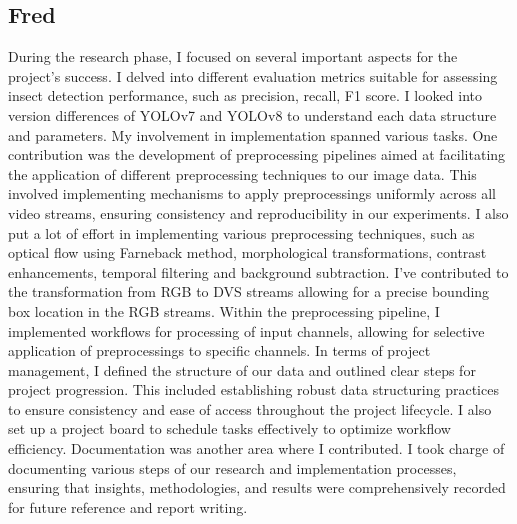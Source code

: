 \documentclass[sigchi,screen]{acmart}
\begin{document}
\subsection{Fred}

During the research phase, I focused on several important aspects for the project's success. I delved into different evaluation metrics suitable for assessing insect detection performance, such as precision, recall, F1 score. I looked into version differences of YOLOv7 and YOLOv8 to understand each data structure and parameters.
My involvement in implementation spanned various tasks. One contribution was the development of preprocessing pipelines aimed at facilitating the application of different preprocessing techniques to our image data. This involved implementing mechanisms to apply preprocessings uniformly across all video streams, ensuring consistency and reproducibility in our experiments. I also put a lot of effort in implementing various preprocessing techniques, such as optical flow using Farneback method, morphological transformations, contrast enhancements, temporal filtering and background subtraction.
I've contributed to the transformation from RGB to DVS streams allowing for a precise bounding box location in the RGB streams.
Within the preprocessing pipeline, I implemented workflows for processing of input channels, allowing for selective application of preprocessings to specific channels.
In terms of project management, I defined the structure of our data and outlined clear steps for project progression. This included establishing robust data structuring practices to ensure consistency and ease of access throughout the project lifecycle. I also set up a project board to schedule tasks effectively to optimize workflow efficiency.
Documentation was another area where I contributed. I took charge of documenting various steps of our research and implementation processes, ensuring that insights, methodologies, and results were comprehensively recorded for future reference and report writing.
\end{document}
